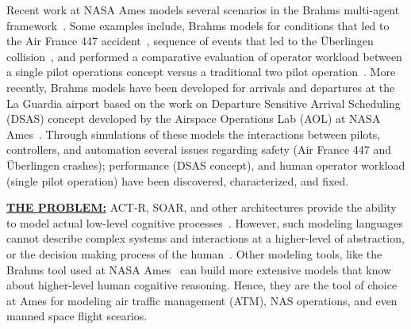 \documentclass[12pt]{article}
\newcommand{\bi}{\begin{itemize}[leftmargin=0.4cm]}
\newcommand{\ei}{\end{itemize}}
\begin{document}
Recent work at NASA Ames models several scenarios in the Brahms multi-agent framework~\cite{clancey1998brahms,SierhuisPhD}. Some examples include, Brahms models for conditions that led to the Air France 447 accident~\cite{hunter:aamas13}, sequence of events that led to the \"{U}berlingen collision~\cite{Rungta:2013}, and performed a comparative evaluation of operator workload between a single pilot operations concept versus a traditional two pilot
operation~\cite{Stocker:2015}. More recently, Brahms models have been developed for arrivals and departures at the La Guardia airport based on the work on Departure Sensitive Arrival Scheduling (DSAS) concept developed by the Airspace Operations Lab (AOL) at NASA Ames~\cite{dsas}. Through simulations of these models the interactions between pilots, controllers, and automation several issues regarding safety (Air France 447 and  \"{U}berlingen crashes); performance (DSAS concept), and human operator workload (single pilot operation) have been discovered, characterized, and fixed. 




\noindent
\underline{{\bf THE PROBLEM:}} 
ACT-R, SOAR, and other architectures provide the ability to model actual low-level cognitive processes~\cite{anderson1997act,laird1987soar,lebiere2013cognitive,liu2009qn,lundinsimulating}. However,  such modeling languages cannot  describe complex systems and interactions at a higher-level of abstraction, or   the decision making process of the human~\cite{pritchett2011simulating}. 
Other modeling tools, like the Brahms tool used at NASA Ames~\cite{Rungta:2013,Clancey:1998:BSP:306180.306196,brahms-semantics,brahms-jelia,SierhuisPhD} can build more extensive models that know about higher-level human cognitive reasoning. Hence, they are the tool of choice at Ames for modeling air traffic management (ATM), NAS operations, and even manned space flight scearios.
\end{document}
